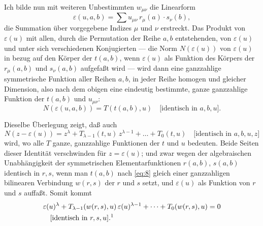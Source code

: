 \documentclass[fontsize=10pt,paper=a5,pagesize,headings=small]{scrbook}
\theoremstyle{plain}
\begin{document}
Ich bilde nun mit weiteren Unbestimmten $w_{\mu\nu}$ die Linearform
\begin{equation}
\label{eq:9}
\varepsilon(u,a,b) = \sum u_{\mu\nu}\, r_\mu(a) \cdot s_\nu(b),
\end{equation}
die Summation über vorgegebene Indizes $\mu$ und $\nu$ erstreckt. Das Produkt von
$\varepsilon(u)$ mit allen, durch die Permutation der Reihe $a,b$ entstehenden, von
$\varepsilon(u)$ und unter sich verschiedenen Konjugierten --- die Norm
$N(\varepsilon(u))$ von $\varepsilon(u)$ in bezug auf den Körper der $t(a,b)$, wenn $\varepsilon(u)$
als Funktion des Körpers der $r_\mu(a,b)$ und $s_\nu(a,b)$ aufgefaßt wird --- wird dann
eine ganzzahlige symmetrische Funktion aller Reihen $a,b$, in jeder Reihe homogen
und gleicher Dimension, also nach dem obigen eine eindeutig bestimmte, ganze
ganzzahlige Funktion der $t(a,b)$ und $u_{\mu\nu}$:
\begin{equation}
\label{eq:10}
N(\varepsilon(u,a,b)) = T(t(a,b),u) \quad \text{[identisch in $a,b,u$]}.
\end{equation}

Dieselbe Überlegung zeigt, daß auch
\[ N(z - \varepsilon(u)) = z^\lambda + T_{\lambda-1}(t,u)\,z^{\lambda-1} + \dots + T_0(t,u)
\quad \text{[identisch in $a,b,u,z$]} \]
wird, wo alle $T$ ganze, ganzzahlige Funktionen der $t$ und $u$ bedeuten. Beide
Seiten dieser Identität verschwinden für $z = \varepsilon(u)$; und zwar wegen der
algebraischen Unabhängigkeit der symmetrischen Elementarfunktionen $r(a,b)$,
$s(a,b)$ identisch in $r,s$, wenn man $t(a,b)$ nach \eqref{eq:8} gleich einer ganzzahligen
bilinearen Verbindung $w(r,s)$ der $r$ und $s$ setzt, und $\varepsilon(u)$ als Funktion von
$r$ und $s$ auffaßt. Somit kommt
\begin{equation}
\label{eq:11}
\begin{aligned}
&\varepsilon(u)^\lambda + T_{\lambda-1}(w(r,s),u)\,\varepsilon(u)^{\lambda-1} + \dots + T_0(w(r,s),u) = 0\\
&\quad \text{[identisch in $r,s,u$].}\text{\footnotemark}
\end{aligned}
\end{equation}

\newpage
\setcounter{page}{415}
\end{document}
